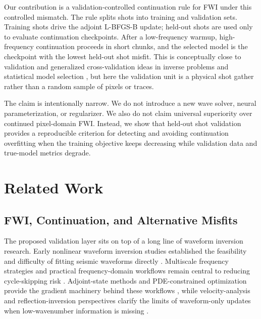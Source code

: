 \documentclass[10pt,twocolumn]{article}
\begin{document}
Our contribution is a validation-controlled continuation rule for FWI
under this controlled mismatch. The rule splits shots into training and
validation sets. Training shots drive the adjoint L-BFGS-B update; held-out
shots are used only to evaluate continuation checkpoints. After a
low-frequency warmup, high-frequency continuation proceeds in short
chunks, and the selected model is the checkpoint with the lowest held-out
shot misfit. This is conceptually close to validation and generalized
cross-validation ideas in inverse problems and statistical model selection
\cite{golub1979generalized,hansen2010discrete}, but here the validation
unit is a physical shot gather rather than a random sample of pixels or
traces.

The claim is intentionally narrow. We do not introduce a new wave solver,
neural parameterization, or regularizer. We also do not claim universal
superiority over continued pixel-domain FWI. Instead, we show that
held-out shot validation provides a reproducible criterion for detecting
and avoiding continuation overfitting when the training objective keeps
decreasing while validation data and true-model metrics degrade.

\section{Related Work}
\subsection{FWI, Continuation, and Alternative Misfits}
The proposed validation layer sits on top of a long line of waveform
inversion research. Early nonlinear waveform inversion studies established
the feasibility and difficulty of fitting seismic waveforms directly
\cite{gauthier1986twodimensional,mora1987nonlinear,pratt1990crosshole,
pratt1998gaussnewton,pratt1999seismic}. Multiscale frequency strategies
and practical frequency-domain workflows remain central to reducing
cycle-skipping risk
\cite{bunks1995multiscale,sirgue2004efficient,ravaut2004multiscale,
sirgue2010valhall,warner2013anisotropic,virieux2009overview}.
Adjoint-state methods and
PDE-constrained optimization provide the gradient machinery behind these
workflows
\cite{plessix2006review,tromp2005seismic,fichtner2006adjoint,
haber2012effective,metivier2013truncated}, while velocity-analysis and
reflection-inversion perspectives clarify the limits of waveform-only
updates when low-wavenumber information is missing
\cite{symes2008migration,symes2009reflection}.
\end{document}
